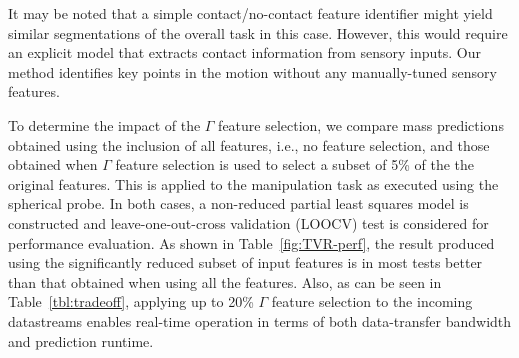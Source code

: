 It may be noted that a simple contact/no-contact feature identifier might yield similar segmentations of the overall task in this case.
However, this would require an explicit model that extracts contact information from sensory inputs.
Our method identifies key points in the motion without any manually-tuned sensory features.






To determine the impact of the $\Gamma$ feature selection, we compare mass predictions obtained using the inclusion of all features, i.e., no feature selection, and those obtained when $\Gamma$ feature selection is used to select a subset of 5\% of the the original features.
This is applied to the manipulation task as executed using the spherical probe.
In both cases, a non-reduced partial least squares model is constructed and leave-one-out-cross validation (LOOCV) test is considered for performance evaluation.
As shown in Table~\ref{fig:TVR-perf}, the result produced using the significantly reduced subset of input features is in most tests better than that obtained when using all the features.
Also, as can be seen in Table~\ref{tbl:tradeoff}, applying up to 20\% $\Gamma$ feature selection to the incoming datastreams enables real-time operation in terms of both data-transfer bandwidth and prediction runtime.

